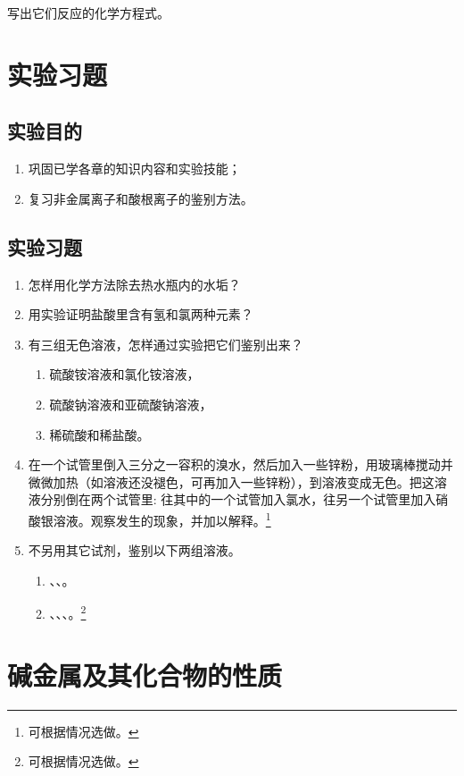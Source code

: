 \begin{enumerate}[1.]
  写出它们反应的化学方程式。
\end{enumerate}

\section{实验习题}
\subsection*{实验目的}
\begin{enumerate}[1.]
  \item 巩固已学各章的知识内容和实验技能；
  \item 复习非金属离子和酸根离子的鉴别方法。
\end{enumerate}
\subsection*{实验习题}
\begin{enumerate}[1.]
  \item 怎样用化学方法除去热水瓶内的水垢？
  \item 用实验证明盐酸里含有氢和氯两种元素？
  \item 有三组无色溶液，怎样通过实验把它们鉴别出来？
  \begin{enumerate}[(1)]
    \item 硫酸铵溶液和氯化铵溶液，
    \item 硫酸钠溶液和亚硫酸钠溶液，
    \item 稀硫酸和稀盐酸。
  \end{enumerate}
  \item 在一个试管里倒入三分之一容积的溴水，然后加入一些锌粉，用玻璃棒搅动并微微加热（如溶液还没褪色，可再加入一些锌粉），到溶液变成无色。把这溶液分别倒在两个试管里: 往其中的一个试管加入氯水，往另一个试管里加入硝酸银溶液。观察发生的现象，并加以解释。\footnote{可根据情况选做。}
  \item 不另用其它试剂，鉴别以下两组溶液。
  \begin{enumerate}[(1)]
    \item {}、、。
    \item {}、、、。\footnote{可根据情况选做。}
  \end{enumerate}
\end{enumerate}

\section{碱金属及其化合物的性质}
